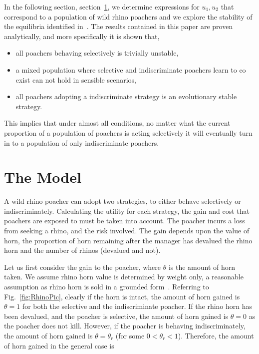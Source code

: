 \documentclass[10pt]{article}
\begin{document}
In the following section, section~\ref{section:the_model}, we determine expressions
for \(u_1, u_2\) that correspond to a population of wild rhino poachers and we
explore the stability of the equilibria identified in~\cite{Lee}. The results
contained in this paper are proven analytically, and more specifically it is 
shown that,

\begin{itemize}
	\item all poachers behaving selectively is trivially unstable,  
	\item a mixed population where selective and indiscriminate poachers
	learn to co exist can not hold in sensible scenarios,
	\item all poachers adopting a indiscriminate strategy is an evolutionary 
	stable strategy.
\end{itemize}

This implies that under almost all conditions, no matter what the current proportion of
a population of poachers is acting selectively it will eventually turn in to a population
of only indiscriminate poachers.
\section{The Model}\label{section:the_model}

A wild rhino poacher can adopt two strategies, to either behave selectively
or indiscriminately. Calculating the utility for each strategy, the gain and cost
that poachers are exposed to must be taken into account. The poacher incurs a
loss from seeking a rhino, and the risk involved. The gain depends upon the value
of horn, the proportion of horn remaining after the manager has devalued the 
rhino horn and the number of rhinos (devalued and not).

Let us first consider the gain to the poacher, where \(\theta\) is the amount of 
horn taken. We assume rhino horn value is determined by weight only, a 
reasonable assumption as rhino horn is sold in a grounded form~\cite{Saverhino}.
Referring to Fig.~\ref{fig:RhinoPic}, clearly if the horn is intact, the amount of
horn gained is \(\theta=1\) for both the selective and the indiscriminate poacher.
If the rhino horn has been devalued, and the poacher is selective, the amount of horn 
gained is \(\theta=0\) as the poacher does not kill. However, if the poacher is 
behaving indiscriminately, the amount of horn gained is \(\theta = \theta_r\)
(for some \(0<\theta_r<1\)). 
Therefore, the amount of horn gained in the general case is
\end{document}
